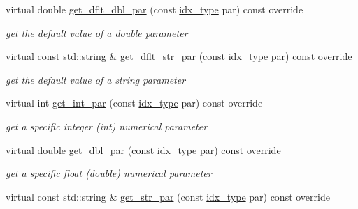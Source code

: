 \begin{Indent}
\begin{DoxyCompactItemize}
virtual double \mbox{\hyperlink{class_s_m_spp__di__unipi__it_1_1_f_row_constraint_a465a771c115acf8d5f4e32e22f003014}{get\+\_\+dflt\+\_\+dbl\+\_\+par}} (const \mbox{\hyperlink{class_s_m_spp__di__unipi__it_1_1_thin_compute_interface_aa3d710629ad8c434286726ad810c3b47}{idx\+\_\+type}} par) const override
\begin{DoxyCompactList}\small\item\em get the default value of a double parameter \end{DoxyCompactList}\item 
virtual const std\+::string \& \mbox{\hyperlink{class_s_m_spp__di__unipi__it_1_1_f_row_constraint_a4d332ec2a836a87b0bd3b3539752e89f}{get\+\_\+dflt\+\_\+str\+\_\+par}} (const \mbox{\hyperlink{class_s_m_spp__di__unipi__it_1_1_thin_compute_interface_aa3d710629ad8c434286726ad810c3b47}{idx\+\_\+type}} par) const override
\begin{DoxyCompactList}\small\item\em get the default value of a string parameter \end{DoxyCompactList}\item 
virtual int \mbox{\hyperlink{class_s_m_spp__di__unipi__it_1_1_f_row_constraint_aaaa5e72533153b149c26c1cc7ab1fe70}{get\+\_\+int\+\_\+par}} (const \mbox{\hyperlink{class_s_m_spp__di__unipi__it_1_1_thin_compute_interface_aa3d710629ad8c434286726ad810c3b47}{idx\+\_\+type}} par) const override
\begin{DoxyCompactList}\small\item\em get a specific integer (int) numerical parameter \end{DoxyCompactList}\item 
virtual double \mbox{\hyperlink{class_s_m_spp__di__unipi__it_1_1_f_row_constraint_af7101b9f3e872b6ad9129ab99cff4cb7}{get\+\_\+dbl\+\_\+par}} (const \mbox{\hyperlink{class_s_m_spp__di__unipi__it_1_1_thin_compute_interface_aa3d710629ad8c434286726ad810c3b47}{idx\+\_\+type}} par) const override
\begin{DoxyCompactList}\small\item\em get a specific float (double) numerical parameter \end{DoxyCompactList}\item 
virtual const std\+::string \& \mbox{\hyperlink{class_s_m_spp__di__unipi__it_1_1_f_row_constraint_a3e17318e51ccc01da85e2627b810d6a7}{get\+\_\+str\+\_\+par}} (const \mbox{\hyperlink{class_s_m_spp__di__unipi__it_1_1_thin_compute_interface_aa3d710629ad8c434286726ad810c3b47}{idx\+\_\+type}} par) const override

\end{DoxyCompactItemize}
\end{Indent}
